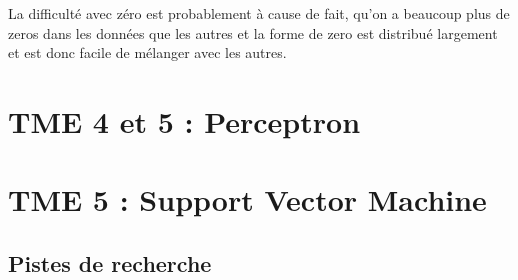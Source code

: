 \documentclass[a4paper,12pt]{article}
\begin{document}
La difficulté avec zéro est probablement à cause de fait, qu'on a beaucoup plus de zeros dans les données que les autres et la forme de zero est distribué largement
et est donc facile de mélanger avec les autres.


\section{TME 4 et 5 : Perceptron}

\section{TME 5 : Support Vector Machine}


\subsection{Pistes de recherche}



\end{document}
